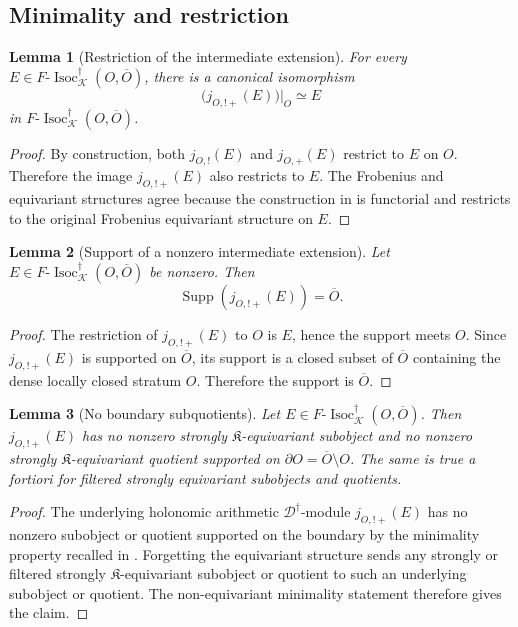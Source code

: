 \documentclass[11pt]{amsart}
\theoremstyle{plain}
\newtheorem{lemma}{Lemma}[section]
\theoremstyle{definition}
\theoremstyle{remark}
\newcommand{\Isoc}{\operatorname{Isoc}}
\newcommand{\Supp}{\operatorname{Supp}}
\begin{document}
\subsection{Minimality and restriction}

\begin{lemma}[Restriction of the intermediate extension]
\label{lem:restriction-intermediate-extension}
For every \(E\in F\text{-}\Isoc^{\dagger}_{\mathcal K}(O,\overline O)\), there is a
canonical isomorphism
\[
  \bigl(j_{O,!+}(E)\bigr)|_O\simeq E
\]
in \(F\text{-}\Isoc^\dagger_{\mathcal K}(O,\overline O)\).
\end{lemma}

\begin{proof}
By construction, both \(j_{O,!}(E)\) and \(j_{O,+}(E)\) restrict to \(E\) on
\(O\). Therefore the image \(j_{O,!+}(E)\) also restricts to \(E\). The
Frobenius and equivariant structures agree because the construction in
 is functorial and restricts to the
original Frobenius equivariant structure on \(E\).
\end{proof}

\begin{lemma}[Support of a nonzero intermediate extension]
\label{lem:support-middle-extension}
Let \(E\in F\text{-}\Isoc^{\dagger}_{\mathcal K}(O,\overline O)\) be nonzero. Then
\[
  \Supp(j_{O,!+}(E))=\overline O.
\]
\end{lemma}

\begin{proof}
The restriction of \(j_{O,!+}(E)\) to \(O\) is \(E\), hence the support meets
\(O\). Since \(j_{O,!+}(E)\) is supported on \(\overline O\), its support is a
closed subset of \(\overline O\) containing the dense locally closed stratum
\(O\). Therefore the support is \(\overline O\).
\end{proof}

\begin{lemma}[No boundary subquotients]
\label{lem:no-boundary-subquotients}
Let \(E\in F\text{-}\Isoc^{\dagger}_{\mathcal K}(O,\overline O)\). Then
\(j_{O,!+}(E)\) has no nonzero strongly \(\mathfrak K\)-equivariant subobject
and no nonzero strongly \(\mathfrak K\)-equivariant quotient supported on
\(\partial O=\overline O\setminus O\). The same is true a fortiori for filtered
strongly equivariant subobjects and quotients.
\end{lemma}

\begin{proof}
The underlying holonomic arithmetic \(\mathscr D^\dagger\)-module
\(j_{O,!+}(E)\) has no nonzero subobject or quotient supported on the boundary
by the minimality property recalled in .
Forgetting the equivariant structure sends any strongly or filtered strongly
\(\mathfrak K\)-equivariant subobject or quotient to such an underlying
subobject or quotient. The non-equivariant minimality statement therefore gives
the claim.
\end{proof}
\end{document}
